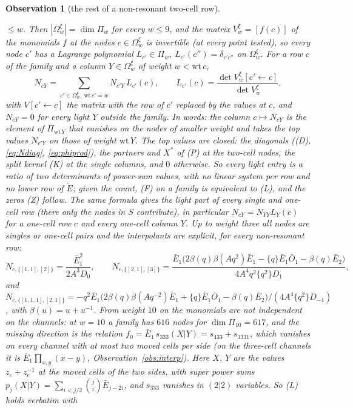 \documentclass[11pt]{article}
\newtheorem{observation}{Observation}
\newcommand{\Et}{\widetilde{E}}
\begin{document}
\begin{observation}[the rest of a non-resonant two-cell row]
\begin{itemize}
$\le w$.  Then $|\Omega^\xi_w|=\dim\Pi_w$ for every $w\le9$, and the matrix $V^\xi_w=[f(c)]$ of the monomials $f$ at the
nodes $c\in\Omega^\xi_w$ is invertible (at every point tested), so every node $c'$ has a Lagrange polynomial
$L_{c'}\in\Pi_w$, $L_{c'}(c'')=\delta_{c'c''}$ on $\Omega^\xi_w$.  For a row $c$ of the family and a column
$Y\in\Omega^\xi_w$ of weight $w<\mathrm{wt}\,c$,
\begin{equation}\label{eq:lagrange}
N_{cY}=\sum_{c'\in\Omega^\xi_w,\ \mathrm{wt}\,c'=w}N_{c'Y}\,L_{c'}(c),\qquad
L_{c'}(c)=\frac{\det V^\xi_w[c'\leftarrow c]}{\det V^\xi_w},
\end{equation}
with $V[c'\leftarrow c]$ the matrix with the row of $c'$ replaced by the values at $c$, and $N_{cY}=0$ for every light $Y$
outside the family.  In words: the column $c\mapsto N_{cY}$ is the element of $\Pi_{\mathrm{wt}\,Y}$ that vanishes on the
nodes of smaller weight and takes the top values $N_{c'Y}$ on those of weight $\mathrm{wt}\,Y$.  The top values are closed:
the diagonals ((D), \eqref{eq:Ndiag}, \eqref{eq:phiprod}), the partners and $X^*$ of (P) at the two-cell nodes, the split
kernel (K) at the single columns, and $0$ otherwise.  So every light entry is a ratio of two determinants of power-sum
values, with no linear system per row and no lower row of $\Et$; given the count, (F) on a family is equivalent to (L),
and the zeros (Z) follow.  The same formula gives the light part of every single and one-cell row (there only the nodes
in $S$ contribute), in particular $N_{cY}=N_{YY}L_Y(c)$ for a one-cell row $c$ and every one-cell column $Y$.  Up to weight
three all nodes are singles or one-cell pairs and the interpolants are explicit, for every non-resonant row:
\[
N_{c,\{[1,1],[2]\}}=\frac{\bar E_1^2}{2A^3D_0},\qquad
N_{c,\{[2,1],[3]\}}=\frac{\bar E_1\bigl(2\beta(q)\beta(Aq^2)\bar E_1-\{q\}\bar E_1\bar O_1-\beta(q)\bar E_2\bigr)}
{4A^4q^2\{q^2\}D_1},
\]
and $N_{c,\{[1,1,1],[2,1]\}}=-q^2\bar E_1\bigl(2\beta(q)\beta(Aq^{-2})\bar E_1+\{q\}\bar E_1\bar O_1-\beta(q)\bar E_2\bigr)
/(4A^4\{q^2\}D_{-1})$, with $\beta(u)=u+u^{-1}$.  From weight $10$ on the monomials are not independent on the
channels: at $w=10$ a family has $616$ nodes for $\dim\Pi_{10}=617$, and the missing direction is the relation
$f_0=\bar E_1\,s_{333}(X|Y)=s_{433}+s_{3331}$, which vanishes on every channel with at most two moved cells per side
(on the three-cell channels it is $\bar E_1\prod_{x,y}(x-y)$, Observation~\ref{obs:interp}).
Here $X$, $Y$ are the values $z_e+z_e^{-1}$ at the moved cells of the two sides, with super power sums
$p_j(X|Y)=\sum_{i<j/2}\binom ji\bar E_{j-2i}$, and $s_{333}$ vanishes in $(2|2)$ variables.  So (L) holds verbatim with

\end{itemize}
\end{observation}
\end{document}
